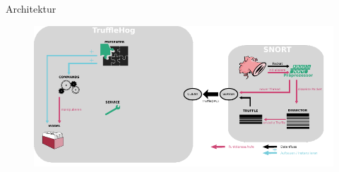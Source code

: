 \begin{frame}{Architektur}
    \begin{figure}
    	\centering
    	\includegraphics[width=\textwidth]{./images/arch/12.pdf}
    \end{figure}
\end{frame}
